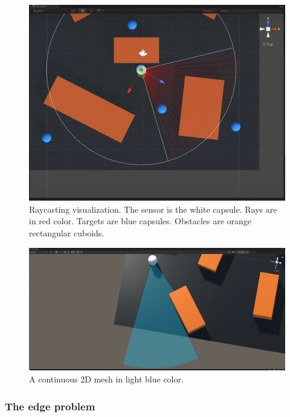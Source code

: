 \documentclass{article}
\begin{document}
\begin{figure} %
	\centering
	\includegraphics[width=1\columnwidth]{FOV(5).png} %
	\caption{Raycasting visualization. The sensor is the white capsule. Rays are in red color. Targets are blue capsules. Obstacles are orange rectangular cuboids.}
\end{figure}

\begin{figure} %
	\centering
	\includegraphics[width=1\columnwidth]{FOV(6).png} %
	\caption{A continuous 2D mesh in light blue color.}
\end{figure}

\subsubsection{The edge problem}
\end{document}
